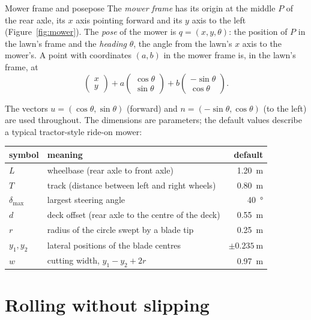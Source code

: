 \begin{definition}{Mower frame and pose}{pose}
  The \emph{mower frame} has its origin at the middle $P$ of the rear axle,
  its $x$ axis pointing forward and its $y$ axis to the left
  (Figure~\ref{fig:mower}). The \emph{pose} of the mower is
  $q = (x, y, \theta)$: the position of $P$ in the lawn's frame and the
  \emph{heading} $\theta$, the angle from the lawn's $x$ axis to the mower's.
  A point with coordinates $(a, b)$ in the mower frame is, in the lawn's
  frame, at
  \[
    \begin{pmatrix} x \\ y \end{pmatrix}
    + a \begin{pmatrix} \cos\theta \\ \sin\theta \end{pmatrix}
    + b \begin{pmatrix} -\sin\theta \\ \cos\theta \end{pmatrix}.
  \]
\end{definition}

The vectors $u = (\cos\theta, \sin\theta)$ (forward) and
$n = (-\sin\theta, \cos\theta)$ (to the left) are used throughout. The
dimensions are parameters; the default values describe a typical
tractor-style ride-on mower:

\begin{center}
\begin{tabular}{@{}llr@{}}
  \toprule
  symbol & meaning & default \\
  \midrule
  $L$ & wheelbase (rear axle to front axle) & \SI{1.20}{\metre} \\
  $T$ & track (distance between left and right wheels) & \SI{0.80}{\metre} \\
  $\delta_{\max}$ & largest steering angle & \SI{40}{\degree} \\
  $d$ & deck offset (rear axle to the centre of the deck) &
    \SI{0.55}{\metre} \\
  $r$ & radius of the circle swept by a blade tip & \SI{0.25}{\metre} \\
  $y_1, y_2$ & lateral positions of the blade centres &
    $\pm\SI{0.235}{\metre}$ \\
  $w$ & cutting width, $y_1 - y_2 + 2r$ & \SI{0.97}{\metre} \\
  \bottomrule
\end{tabular}
\end{center}

\section{Rolling without slipping}

